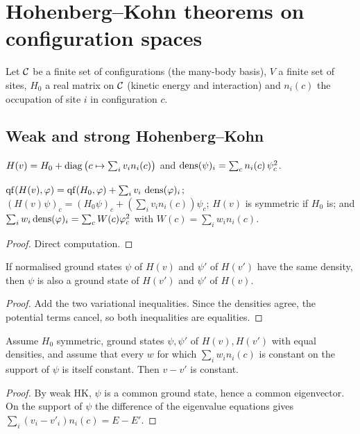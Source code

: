 \chapter{Hohenberg--Kohn theorems on configuration spaces}
\label{chap:hk}

Let $\mathcal{C}$ be a finite set of configurations (the many-body basis), $V$ a finite set of sites, $H_0$ a real
matrix on $\mathcal{C}$ (kinetic energy and interaction) and $n_i(c)$ the occupation of site $i$ in configuration $c$.

\section{Weak and strong Hohenberg--Kohn}

\begin{definition}
  \label{def:hamN}
  \leanok
  $H(v) = H_0 + \operatorname{diag}\big(c\mapsto \sum_i v_i n_i(c)\big)$ and
  $\operatorname{dens}(\psi)_i = \sum_c n_i(c)\,\psi_c^2$.
\end{definition}

\begin{lemma}
  \label{lem:hamN_basic}
  \leanok
  $\operatorname{qf}(H(v),\varphi) = \operatorname{qf}(H_0,\varphi) + \sum_i v_i\,\operatorname{dens}(\varphi)_i$;
  $(H(v)\psi)_c = (H_0\psi)_c + (\sum_i v_in_i(c))\psi_c$; $H(v)$ is symmetric if $H_0$ is; and
  $\sum_i w_i\operatorname{dens}(\varphi)_i = \sum_c W(c)\varphi_c^2$ with $W(c)=\sum_i w_in_i(c)$.
\end{lemma}
\begin{proof}
  \leanok
  Direct computation.
\end{proof}

\begin{theorem}
  \label{thm:weak_hk}
  \leanok
  If normalised ground states $\psi$ of $H(v)$ and $\psi'$ of $H(v')$ have the same density, then $\psi$ is
  also a ground state of $H(v')$ and $\psi'$ of $H(v)$.
\end{theorem}
\begin{proof}
  \leanok
  Add the two variational inequalities. Since the densities agree, the potential terms cancel, so both
  inequalities are equalities.
\end{proof}

\begin{theorem}
  \label{thm:strong_hk}
  \leanok
  Assume $H_0$ symmetric, ground states $\psi,\psi'$ of $H(v),H(v')$ with equal densities, and assume that every
  $w$ for which $\sum_i w_in_i(c)$ is constant on the support of $\psi$ is itself constant. Then $v-v'$ is
  constant.
\end{theorem}
\begin{proof}
  \leanok
  By weak HK, $\psi$ is a common ground state, hence a common eigenvector. On the support of $\psi$ the
  difference of the eigenvalue equations gives $\sum_i(v_i-v'_i)n_i(c)=E-E'$.
\end{proof}

